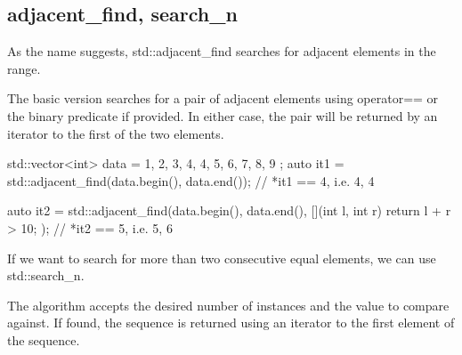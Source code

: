\subsection{adjacent\_find, search\_n}

As the name suggests, std::adjacent\_find searches for adjacent elements in the range.



The basic version searches for a pair of adjacent elements using operator== or the binary predicate if provided. In either case, the pair will be returned by an iterator to the first of the two elements.

\begin{box-note}
\begin{cppcode}
std::vector<int> data = { 1, 2, 3, 4, 4, 5, 6, 7, 8, 9 };
auto it1 = std::adjacent_find(data.begin(), data.end());
// *it1 == 4, i.e. {4, 4}

auto it2 = std::adjacent_find(data.begin(), data.end(), 
                              [](int l, int r) { return l + r > 10; });
// *it2 == 5, i.e. {5, 6}
\end{cppcode}
\end{box-note}

If we want to search for more than two consecutive equal elements, we can use std::search\_n.



The algorithm accepts the desired number of instances and the value to compare against. If found, the sequence is returned using an iterator to the first element of the sequence.

\begin{box-note}
\end{box-note}

